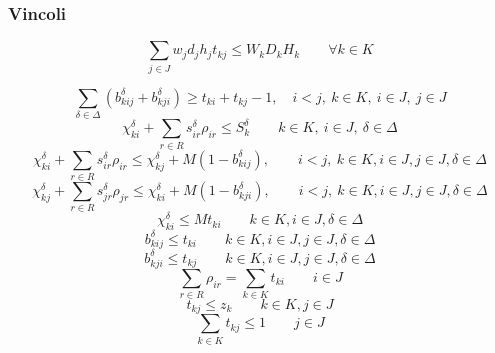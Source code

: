 \documentclass{scrartcl}
\begin{document}
\subsubsection{Vincoli}
\begin{equation}
\label{eq:constraint:volume}
\sum_{j \in J} w_j d_j h_j t_{kj} \leq W_kD_kH_k \quad\quad \forall k \in K 
\end{equation}

\begin{equation}
\sum_{\delta\in\Delta}(b_{kij}^\delta + b_{kji}^\delta) \geq t_{ki} + t_{kj} - 1, \quad i < j,\ k \in K,\ i \in J,\ j \in J
\end{equation}
\begin{equation}
\label{eq:constraint:coodinateLessThanSkdelta}
\chi_{ki}^\delta + \sum_{r \in R} s_{ir}^\delta \rho_{ir} \leq S_k^\delta \quad \quad k \in K,\ i \in J,\ \delta \in \Delta
\end{equation}
\begin{equation}
\chi_{ki}^\delta + \sum_{r \in R} s_{ir}^\delta \rho_{ir} \leq \chi_{kj}^\delta + M(1 - b_{kij}^\delta), \quad \quad i < j,\ k \in K, i \in J, j \in J, \delta \in \Delta
\end{equation}
\begin{equation}
\chi_{kj}^\delta + \sum_{r \in R} s_{jr}^\delta \rho_{jr} \leq \chi_{ki}^\delta + M(1 - b_{kji}^\delta), \quad \quad i < j,\ k \in K, i \in J, j \in J, \delta \in \Delta
\end{equation}
\begin{equation}
\chi_{ki}^\delta \leq M t_{ki}\quad\quad k \in K, i \in J, \delta \in \Delta
\end{equation}
\begin{equation}
b_{kij}^\delta \leq t_{ki}\quad \quad k \in K, i \in J, j \in J, \delta \in \Delta
\end{equation}
\begin{equation}
b_{kji}^\delta \leq t_{kj} \quad \quad k \in K, i \in J, j \in J, \delta \in \Delta
\end{equation}
\begin{equation}
\sum_{r \in R} \rho_{ir} = \sum_{k \in K} t_{ki}\quad \quad i \in J
\end{equation}
\begin{equation}
\label{constraint:multi:tkzk}
t_{kj} \leq z_k\quad \quad k \in K, j \in J
\end{equation}
\begin{equation}
\label{constraint:multi:onlyInOneKnapsack}
\sum_{k \in K} t_{kj} \leq 1 \quad \quad j \in J
\end{equation}
\end{document}
